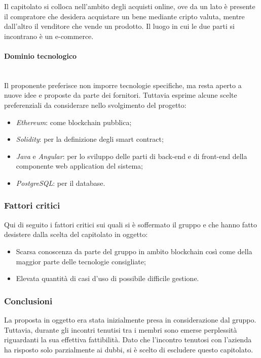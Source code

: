 \documentclass[11pt]{article}
\begin{document}
        \noindent
        Il capitolato si colloca nell'ambito degli acquisti online, ove da un lato è presente il compratore che desidera acquistare un
        bene mediante cripto valuta, mentre dall'altro il venditore che vende un prodotto.
        Il luogo in cui le due parti si incontrano è un e-commerce.
        
        \paragraph{Dominio tecnologico}~\\
        
        \noindent
        Il proponente preferisce non imporre tecnologie specifiche, ma resta aperto a nuove idee e proposte da parte dei fornitori.
        Tuttavia esprime alcune scelte preferenziali da considerare nello svolgimento del progetto:	
        \begin{itemize}
		    \item \textit{Ethereum}: come blockchain pubblica;
		    \item \textit{Solidity}: per la definizione degli smart contract;
			\item \textit{Java} e \textit{Angular}: per lo sviluppo delle parti di back-end e di front-end della componente
			web application del sistema;
			\item \textit{PostgreSQL}: per il database.
		\end{itemize}
    
    \subsubsection{Fattori critici}
    Qui di seguito i fattori critici sui quali si è soffermato il gruppo e che hanno fatto desistere dalla scelta del capitolato in
    oggetto:
   	\begin{itemize}
		\item Scarsa conoscenza da parte del gruppo in ambito blockchain così come della maggior parte delle tecnologie consigliate;
		\item Elevata quantità di casi d'uso di possibile difficile gestione.
	\end{itemize}
	
    \subsubsection{Conclusioni}
    La proposta in oggetto era stata inizialmente presa in considerazione dal gruppo. Tuttavia, durante gli incontri tenutisi tra i membri
    sono emerse perplessità riguardanti la sua effettiva fattibilità. Dato che l'incontro tenutosi con l'azienda ha risposto solo
    parzialmente ai dubbi, si è scelto di escludere questo capitolato. 
    
\end{document}
